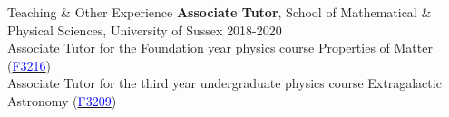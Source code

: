 \documentclass[a4paper,10pt]{resume} %
\begin{document}
\begin{rSection}{Teaching \& Other Experience}
{\textbf{Associate Tutor}, School of Mathematical \& Physical Sciences, University of Sussex} \hfill {2018-2020}
\\
{Associate Tutor for the Foundation year physics course Properties of Matter (\href{http://www.sussex.ac.uk/mps/internal/departments/physicsandastronomy/modules/2020/84006}{\textcolor{blue}{F3216}})}
\\
{Associate Tutor for the third year undergraduate physics course Extragalactic Astronomy (\href{http://www.sussex.ac.uk/mps/internal/departments/physicsandastronomy/modules/2020/75497}{\textcolor{blue}{F3209}})}

\end{rSection} 

\end{document}
